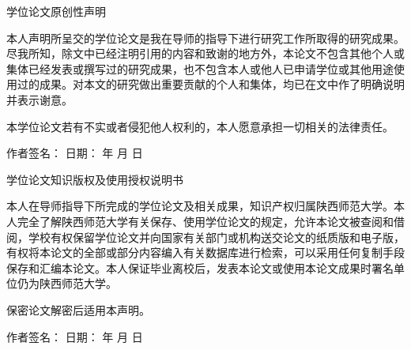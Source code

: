 {
\renewcommand{\baselinestretch}{2} %
\setlength{\parindent}{2em} %
\vspace*{0cm}
\bfseries {
{\centering \songti {} 学位论文原创性声明\par}    %
\vspace{3pt}
本人声明所呈交的学位论文是我在导师的指导下进行研究工作所取得的研究成果。尽我所知，除文中已经注明引用的内容和致谢的地方外，本论文不包含其他个人或集体已经发表或撰写过的研究成果，也不包含本人或他人已申请学位或其他用途使用过的成果。对本文的研究做出重要贡献的个人和集体，均已在文中作了明确说明并表示谢意。

本学位论文若有不实或者侵犯他人权利的，本人愿意承担一切相关的法律责任。

作者签名：\underline{\makebox[7.5em][c]{}}
\quad \quad 日期：
{\makebox[3em][c]{}} 年
{\makebox[1.5em][c]{}} 月
{\makebox[1.5em][c]{}} 日\quad \quad \quad \quad \quad

}
\vspace{1.75cm}
\bfseries{
{\centering \songti {}  学位论文知识版权及使用授权说明书\par}
\vspace{3pt}
本人在导师指导下所完成的学位论文及相关成果，知识产权归属陕西师范大学。本人完全了解陕西师范大学有关保存、使用学位论文的规定，允许本论文被查阅和借阅，学校有权保留学位论文并向国家有关部门或机构送交论文的纸质版和电子版，有权将本论文的全部或部分内容编入有关数据库进行检索，可以采用任何复制手段保存和汇编本论文。本人保证毕业离校后，发表本论文或使用本论文成果时署名单位仍为陕西师范大学。

保密论文解密后适用本声明。

作者签名：\underline{\makebox[7.5em][c]{}}
\quad \quad 日期：
{\makebox[3em][c]{}} 年
{\makebox[1.5em][c]{}} 月
{\makebox[1.5em][c]{}} 日

}
}

\clearpage
\hbox{}
\clearpage